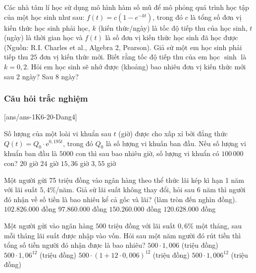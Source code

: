 \begin{bt}%
	Các nhà tâm lí học sử dụng mô hình hàm số mũ để mô phỏng quá trình học tập của một học sinh như sau: $f(t)=c\left(1-e^{-k t}\right)$, trong đó $c$ là tổng số đơn vị kiến thức học sinh phải học, $k$ (kiến thức/ngày) là tốc độ tiếp thu của học sinh, $t$ (ngày) là thời gian học và $f(t)$ là số đơn vị kiến thức học sinh đã học được (Nguồn: R.I. Charles et al., Algebra 2, Pearson). Giả sử một em học sinh phải tiếp thu $25$ đơn vị kiến thức mới. Biết rằng tốc độ tiếp thu của em học $\sinh$ là $k=0{,}2$. Hỏi em học sinh sẽ nhớ được (khoảng) bao nhiêu đơn vị kiến thức mới sau $2$ ngày? Sau $8$ ngày?
\end{bt}
\subsubsection{Câu hỏi trắc nghiệm}
[ans/ans-1K6-20-Dang4]
\begin{ex}%
	Số lượng của một loài vi khuẩn sau $t$ (giờ) được cho xấp xỉ bởi đẳng thức $Q(t)=Q_{0} \cdot \mathrm{e}^{0{,}195 t}$, trong đó $Q_{0}$ là số lượng vi khuấn ban đầu. Nếu số lượng vi khuẩn ban đầu là $5000$ con thì sau bao nhiêu giờ, số lượng vi khuẩn có $100\, 000$ con?
	\choice
	{$20$ giờ}
	{$24$ giờ}
	{\True $15{,}36$ giờ}
	{$3{,}55$ giờ}
\end{ex}

\begin{ex}%
	Một người gửi 75 triệu đồng vào ngân hàng theo thể thức lãi kép kì hạn 1 năm với lãi suất
	$5,4\%$/năm. Giả sử lãi suất không thay đổi, hỏi sau 6 năm thì người đó nhận về số tiền là bao nhiêu kể cả gốc và lãi? (làm tròn đến nghìn đồng).
	\choice
	{\True $102.826.000$ đồng}
	{$97.860.000$ đồng}
	{$150.260.000$ đồng}
	{$120.628.000$ đồng}
	
	
\end{ex}

\begin{ex}%
	Một người gửi vào ngân hàng $500$ triệu đồng với lãi suất $0{,}6\%$ một tháng, sau mỗi tháng lãi suất được nhập vào vốn. Hỏi sau một năm người đó rút tiền thì tổng số tiền người đó nhận được là bao nhiêu?
	\choice
	{$500 \cdot 1{,}006$ (triệu đồng)}
	{$500 \cdot 1{,}06^{12}$ (triệu đồng)}
	{$500 \cdot (1+12\cdot 0{,}006)^{12}$ (triệu đồng)}
	{\True $500 \cdot 1{,}006^{12}$ (triệu đồng)}
\end{ex}

